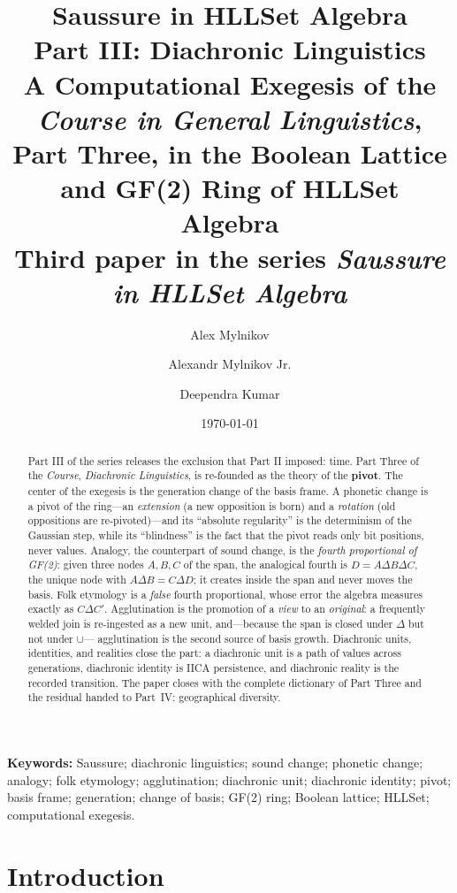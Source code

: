\documentclass[11pt,a4paper]{article}
\title{\textbf{Saussure in HLLSet Algebra}\\[4pt]
\large Part III: Diachronic Linguistics\\[4pt]
\large A Computational Exegesis of the \textit{Course in General Linguistics},\\
Part Three, in the Boolean Lattice and GF(2) Ring of HLLSet Algebra\\[6pt]
\normalsize Third paper in the series \textit{Saussure in HLLSet Algebra}}
\author{Alex Mylnikov \and Alexandr Mylnikov Jr. \and Deependra Kumar}
\date{\today}
\theoremstyle{remark}
\newcommand{\xor}{\ensuremath{\Delta}}                   %
\begin{document}
\maketitle

\begin{abstract}
Part III of the series releases the exclusion that Part II imposed: time.
Part Three of the \textit{Course}, \emph{Diachronic Linguistics}, is re-founded
as the theory of the \textbf{pivot}. The center of the exegesis is the
generation change of the basis frame. A phonetic change is a pivot of the
ring---an \emph{extension} (a new opposition is born) and a \emph{rotation}
(old oppositions are re-pivoted)---and its ``absolute regularity'' is the
determinism of the Gaussian step, while its ``blindness'' is the fact that the
pivot reads only bit positions, never values. Analogy, the counterpart of
sound change, is the \emph{fourth proportional of GF(2)}: given three nodes
$A,B,C$ of the span, the analogical fourth is
$D = A \xor B \xor C$, the unique node with $A \xor B = C \xor D$; it creates
inside the span and never moves the basis. Folk etymology is a \emph{false}
fourth proportional, whose error the algebra measures exactly as
$C \xor C'$. Agglutination is the promotion of a \emph{view} to an
\emph{original}: a frequently welded join is re-ingested as a new unit,
and---because the span is closed under $\xor$ but not under $\cup$---
agglutination is the second source of basis growth. Diachronic units,
identities, and realities close the part: a diachronic unit is a path of
values across generations, diachronic identity is IICA persistence, and
diachronic reality is the recorded transition. The paper closes with the
complete dictionary of Part Three and the residual handed to Part~IV:
geographical diversity.
\end{abstract}

\noindent\textbf{Keywords:} Saussure; diachronic linguistics; sound change;
phonetic change; analogy; folk etymology; agglutination; diachronic unit;
diachronic identity; pivot; basis frame; generation; change of basis; GF(2)
ring; Boolean lattice; HLLSet; computational exegesis.

\section{Introduction}
\label{sec:intro}
\end{document}
